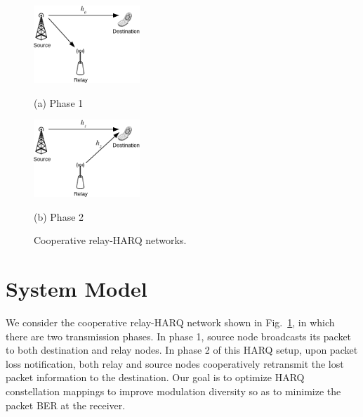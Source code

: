 \documentclass[journal]{IEEEtran}
\begin{document}
\begin{figure}[!t]
    \begin{minipage}[b]{0.48\linewidth}
      \centering
      \centerline{\includegraphics[width=4.0cm]{./figs/relayHARQ1.eps}}
      \centerline{(a) Phase 1}\medskip
    \end{minipage}
    \hfill
    \begin{minipage}[b]{.48\linewidth}
      \centering
      \centerline{\includegraphics[width=4.0cm]{./figs/relayHARQ2.eps}}
      \centerline{(b) Phase 2}\medskip
    \end{minipage}
    \caption{Cooperative relay-HARQ networks.}
    \label{fig:system_model}
\end{figure}


\vspace*{-2mm}
\section{System Model}
\label{sec:model}
\vspace*{-2mm}
We consider the cooperative relay-HARQ network shown in
Fig.~\ref{fig:system_model}, in which there are two transmission phases.
In phase 1, source node broadcasts its packet to both destination and relay
nodes.
In phase 2 of this HARQ setup, upon packet loss notification, both relay and
source nodes cooperatively retransmit the lost packet information to the
destination. Our goal is to optimize HARQ constellation mappings to improve
modulation diversity so as to minimize the packet BER at the receiver.
\end{document}
